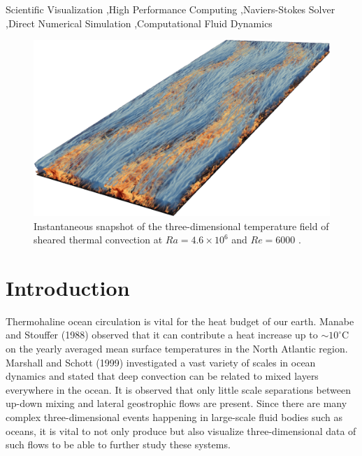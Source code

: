 \documentclass[final,5p,times,twocolumn]{elsarticle}
\begin{document}
\begin{frontmatter}
\begin{abstract}
\end{abstract}

\begin{keyword}

Scientific Visualization \sep High Performance Computing \sep Naviers-Stokes Solver \sep Direct Numerical Simulation \sep Computational Fluid Dynamics

\end{keyword}

\end{frontmatter}


\begin{figure}[!hbt]
	\centering
	\includegraphics[width=\linewidth]{flowfield}%
	\caption{\label{fig:flowfield} Instantaneous snapshot of the three-dimensional temperature field of sheared thermal convection at $ Ra=4.6 \times 10^6 $ and $ Re=6000 $ \cite{bla18}.}
\end{figure}

\section{Introduction}
\label{sec:Introduction}

Thermohaline ocean circulation \cite{rah00} is vital for the heat budget of our earth. Manabe and Stouffer (1988) \cite{man88} observed that it can contribute a heat increase up to $ \sim 10 ^ \circ $C on the yearly averaged mean surface temperatures in the North Atlantic region. Marshall and Schott (1999) \cite{mar99} investigated a vast variety of scales in ocean dynamics and stated that deep convection can be related to mixed layers everywhere in the ocean. It is observed that only little scale separations between up-down mixing and lateral geostrophic flows are present. Since there are many complex three-dimensional events happening in large-scale fluid bodies such as oceans, it is vital to not only produce but also visualize three-dimensional data of such flows to be able to further study these systems.
\end{document}
